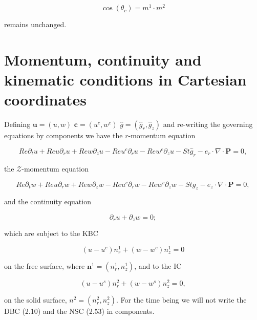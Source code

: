 \documentclass{article}
\begin{document}
\begin{equation}
\cos (\theta_c) = m^1 \cdot m^2 \tag{2.59}
\end{equation}

remains unchanged.

\section{Momentum, continuity and kinematic conditions in Cartesian coordinates}

Defining \(\pmb {u} = (u,w)\) \(\pmb {c} = (u^{c},w^{c})\) \(\hat{g} = (\hat{g}_{r},\hat{g}_{z})\) and re-writing the governing equations by components we have the \(r\)-momentum equation

\begin{equation}
Re\partial_{t}u + Reu\partial_{r}u + Rew\partial_{z}u - Reu^{c}\partial_{r}u - Rew^{c}\partial_{z}u - St\hat{g}_{r} - e_{r}\cdot \nabla \cdot \pmb {P} = 0, \tag{3.1}
\end{equation}

the \(\mathcal{Z}\)-momentum equation

\begin{equation}
Re\partial_{t}w + Reu\partial_{r}w + Rew\partial_{z}w - Reu^{c}\partial_{r}w - Rew^{c}\partial_{z}w - St\hat{g}_{z} - e_{z}\cdot \nabla \cdot \pmb {P} = 0, \tag{3.2}
\end{equation}

and the continuity equation

\begin{equation}
\partial_{r}u + \partial_{z}w = 0; \tag{3.3}
\end{equation}

which are subject to the KBC

\begin{equation}
(u - u^{c})n_{r}^{1} + (w - w^{c})n_{z}^{1} = 0 \tag{3.4}
\end{equation}

on the free surface, where \(\pmb{n}^{1} = (n_{r}^{1},n_{z}^{1})\), and to the IC

\begin{equation}
(u - u^{s})n_{r}^{2} + (w - w^{s})n_{z}^{2} = 0, \tag{3.5}
\end{equation}

on the solid surface, \(n^{2} = (n_{r}^{2},n_{z}^{2})\). For the time being we will not write the DBC (2.10) and the NSC (2.53) in components.
\end{document}
